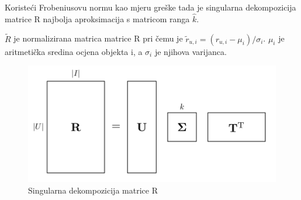 \documentclass[a4paper,oneside,12pt]{memoir} %
\begin{document}
\begin{rem} 
Koristeći Frobeniusovu normu kao mjeru greške tada je singularna dekompozicija matrice R najbolja aproksimacija s matricom ranga $\hat{k}$.
\end{rem}
\begin{defn} $\tilde{R}$ je normalizirana matrica matrice R pri čemu je $\tilde{r}_{u,i} = (r_{u,i}-\mu_i)/\sigma_i$. $\mu_i$ je aritmetička sredina ocjena objekta i, a $\sigma_i$ je njihova varijanca.
\end{defn}
\begin{figure}
\begin{center}
\includegraphics[scale=0.8]{slike/svd_decom.png}
\caption{Singularna dekompozicija matrice R}
\end{center}
\end{figure}
%
\end{document}
